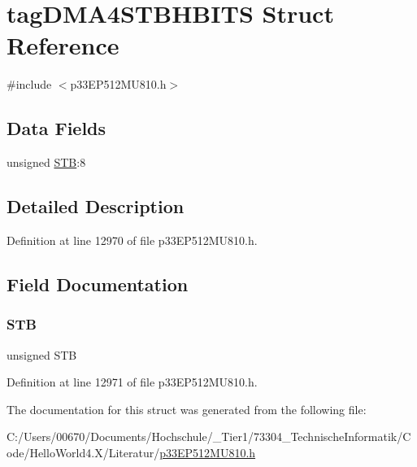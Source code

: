 \hypertarget{structtag_d_m_a4_s_t_b_h_b_i_t_s}{}\section{tag\+D\+M\+A4\+S\+T\+B\+H\+B\+I\+TS Struct Reference}
\label{structtag_d_m_a4_s_t_b_h_b_i_t_s}


{\ttfamily \#include $<$p33\+E\+P512\+M\+U810.\+h$>$}

\subsection*{Data Fields}
\begin{DoxyCompactItemize}
\item 
unsigned \hyperlink{structtag_d_m_a4_s_t_b_h_b_i_t_s_a9bd043a4db27e09b5035a563a8758fe7}{S\+TB}\+:8
\end{DoxyCompactItemize}


\subsection{Detailed Description}


Definition at line 12970 of file p33\+E\+P512\+M\+U810.\+h.



\subsection{Field Documentation}
\mbox{\label{structtag_d_m_a4_s_t_b_h_b_i_t_s_a9bd043a4db27e09b5035a563a8758fe7}} 
\subsubsection{\texorpdfstring{S\+TB}{STB}}
{\footnotesize\ttfamily unsigned S\+TB}



Definition at line 12971 of file p33\+E\+P512\+M\+U810.\+h.



The documentation for this struct was generated from the following file\+:\begin{DoxyCompactItemize}
\item 
C\+:/\+Users/00670/\+Documents/\+Hochschule/\+\_\+\+Tier1/73304\+\_\+\+Technische\+Informatik/\+Code/\+Hello\+World4.\+X/\+Literatur/\hyperlink{p33_e_p512_m_u810_8h}{p33\+E\+P512\+M\+U810.\+h}\end{DoxyCompactItemize}
